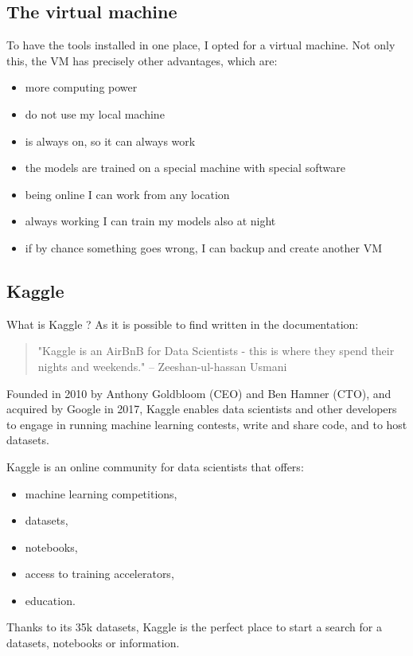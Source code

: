 \subsection{The \gls{virtual machine}}
To have the tools installed in one place, I opted for a virtual machine.
Not only this, the VM has precisely other advantages, which are:
\begin{itemize}
    \item more computing power
    \item do not use my local machine 
    \item is always on, so it can always work
    \item the models are trained on a special machine with special software
    \item being online I can work from any location
    \item always working I can train my models also at night
    \item if by chance something goes wrong, I can backup and create another VM
\end{itemize}

\subsection{Kaggle}
What is Kaggle \cite{noauthor_kaggle_nodate}? 
As it is possible to find written in the documentation: 
\begin{quote}
    "Kaggle is an AirBnB for Data Scientists - this is where they spend their nights and weekends." – Zeeshan-ul-hassan Usmani \cite{zeeshan-ul-hassan_what_2018}
\end{quote}
Founded in 2010 by Anthony Goldbloom (CEO) and Ben Hamner (CTO), and acquired by Google in 2017, Kaggle enables data scientists and other developers to engage in running machine learning contests, write and share code, and to host datasets. 

Kaggle is an online community for data scientists that offers:
\begin{itemize}
    \item machine learning competitions,
    \item datasets,
    \item notebooks,
    \item access to training accelerators,
    \item education.
\end{itemize}
Thanks to its 35k datasets, Kaggle is the perfect place to start a search for a datasets, notebooks or information.

